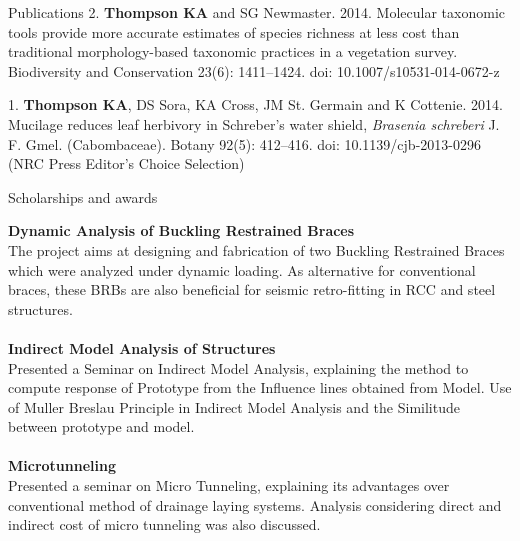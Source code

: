 \documentclass[12pt]{article}
\begin{document}
\begin{rSection}{Publications}
\noindent\hspace{.1cm}2. \textbf{Thompson KA} and SG Newmaster. 2014. Molecular taxonomic tools provide more accurate estimates of species richness at less cost than traditional morphology-based taxonomic practices in a vegetation survey. Biodiversity and Conservation 23(6): 1411–1424. doi: 10.1007/s10531-014-0672-z

\noindent\hspace{.1cm}1. \textbf{Thompson KA}, DS Sora, KA Cross, JM St. Germain and K Cottenie. 2014. Mucilage reduces leaf herbivory in Schreber’s water shield, \textit{Brasenia schreberi} J. F. Gmel. (Cabombaceae). Botany 92(5): 412–416. doi: 10.1139/cjb-2013-0296
(NRC Press Editor’s Choice Selection)

\vspace{0.5em} %


\end{rSection}

\noindent\begin{rSection}{Scholarships and awards}

{\bf Dynamic Analysis of Buckling Restrained Braces}
\\The project aims at designing and fabrication of two Buckling Restrained Braces which were analyzed under dynamic loading. As alternative for conventional braces, these BRBs are also beneficial for seismic retro-fitting in RCC and steel structures.\\
\\{\bf Indirect Model Analysis of Structures}\\
Presented a Seminar on Indirect Model Analysis, explaining the method to compute response of Prototype from the Influence lines obtained from Model. Use of Muller Breslau Principle in Indirect Model Analysis and the Similitude between prototype and  model.\\

\\{\bf Microtunneling}\\
Presented a seminar on Micro Tunneling, explaining its advantages over conventional method of drainage laying systems. Analysis considering direct and indirect cost of micro tunneling was also discussed.

\end{rSection}
\end{document}
